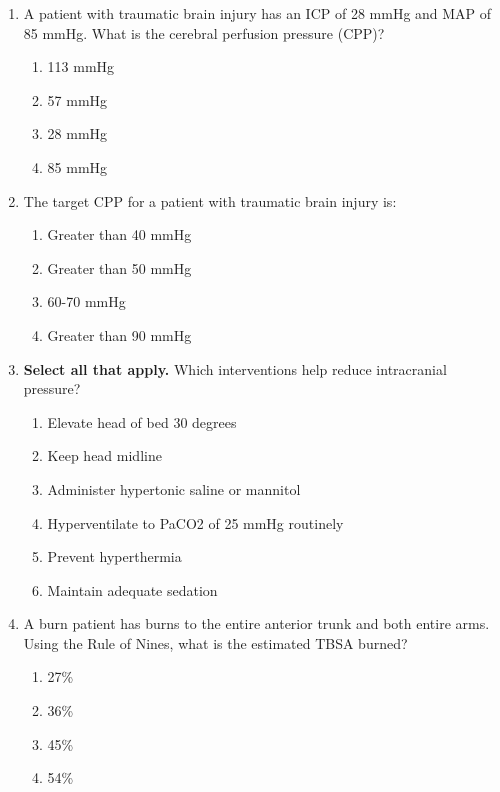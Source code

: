 \documentclass[11pt]{article}
\begin{document}
\begin{enumerate}
\item A patient with traumatic brain injury has an ICP of 28 mmHg and MAP of 85 mmHg. What is the cerebral perfusion pressure (CPP)?

\begin{enumerate}[label=\Alph*.]
    \item 113 mmHg
    \item 57 mmHg
    \item 28 mmHg
    \item 85 mmHg
\end{enumerate}

\item The target CPP for a patient with traumatic brain injury is:

\begin{enumerate}[label=\Alph*.]
    \item Greater than 40 mmHg
    \item Greater than 50 mmHg
    \item 60-70 mmHg
    \item Greater than 90 mmHg
\end{enumerate}

\item \textbf{Select all that apply.} Which interventions help reduce intracranial pressure?

\begin{enumerate}[label=\Alph*.]
    \item Elevate head of bed 30 degrees
    \item Keep head midline
    \item Administer hypertonic saline or mannitol
    \item Hyperventilate to PaCO2 of 25 mmHg routinely
    \item Prevent hyperthermia
    \item Maintain adequate sedation
\end{enumerate}

\item A burn patient has burns to the entire anterior trunk and both entire arms. Using the Rule of Nines, what is the estimated TBSA burned?

\begin{enumerate}[label=\Alph*.]
    \item 27\%
    \item 36\%
    \item 45\%
    \item 54\%
\end{enumerate}


\end{enumerate}
\end{document}
